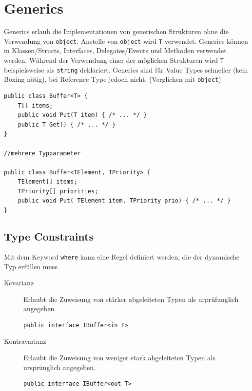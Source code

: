 \documentclass[
a4paper,
oneside,
10pt,
fleqn,
headsepline,
toc=listofnumbered, 
bibliography=totocnumbered]{scrartcl}
\let\stdsection\section
\renewcommand\section{\clearpage\stdsection}
\begin{document}
\section{Generics}
Generics erlaub die Implementationen von generischen Strukturen ohne die Verwendung von \lstinline|object|. Anstelle von \lstinline|object| wird \lstinline|T| verwendet.
Generics können in Klassen/Structs, Interfaces, Delegates/Events und Methoden verwendet werden. Während der Verwendung einer der möglichen Strukturen wird \lstinline|T| beispielsweise als \lstinline|string| deklariert.  Generics sind für Value Types schneller (kein Boxing nötig), bei Reference Type jedoch nicht. (Verglichen mit \lstinline|object|)
\begin{lstlisting}
public class Buffer<T> {
	T[] items;
	public void Put(T item) { /* ... */ }
	public T Get() { /* ... */ }
}

//mehrere Typparameter

public class Buffer<TElement, TPriority> {
    TElement[] items; 
    TPriority[] priorities; 
    public void Put( TElement item, TPriority prio) { /* ... */ } 
} 
\end{lstlisting}

\subsection{Type Constraints}
Mit dem Keyword \lstinline|where| kann eine Regel definiert werden, die der dynamische Typ erfüllen muss.

\begin{description}
	\item[Kovarianz] Erlaubt die Zuweisung von stärker abgeleiteten Typen als urprüfunglich angegeben
		\begin{lstlisting}
public interface IBuffer<in T>
\end{lstlisting}
	\item[Kontravarianz] Erlaubt die Zuweisung von weniger stark abgeleiteten Typen als ursprünglich angegeben.
		\begin{lstlisting}
public interface IBuffer<out T>
\end{lstlisting}
\end{description}
\end{document}

